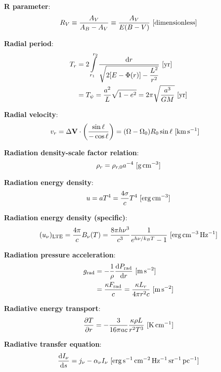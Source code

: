 \documentclass[a4paper,10pt]{article}
\begin{document}
{\noindent}\textbf{R parameter}:
\begin{align*}
    R_V \equiv \frac{A_V}{A_B-A_V} \equiv \frac{A_V}{E(B-V)} ~ [{\rm dimensionless}]
\end{align*}

{\noindent}\textbf{Radial period}:
\begin{align*}
    T_r &= 2\int\limits_{r_1}^{r_2} \frac{{\rm d}r}{\sqrt{2[E-\Phi(r)]-\dfrac{L^2}{r^2}}} ~ [{\rm yr}] \\
    &= T_\psi = \frac{a^2}{L}\sqrt{1-e^2} = 2\pi\sqrt{\frac{a^3}{GM}} ~ [{\rm yr}]
\end{align*}

{\noindent}\textbf{Radial velocity}:
\begin{align*}
    v_r &= \Delta\mathbf{V}\cdot\left(\frac{\sin\ell}{-\cos\ell}\right) = (\Omega-\Omega_0)R_0\sin\ell ~ [{\rm km\,s^{-1}}]
\end{align*}

{\noindent}\textbf{Radiation density-scale factor relation}:
\begin{align*}
    \rho_r = \rho_{r,0}a^{-4} ~ [{\rm g\,cm^{-3}}]
\end{align*}

{\noindent}\textbf{Radiation energy density}:
\begin{align*}
    u = aT^4 = \frac{4\sigma}{c}T^4 ~ [{\rm erg\,cm^{-3}}]
\end{align*}

{\noindent}\textbf{Radiation energy density (specific)}:
\begin{align*}
    (u_\nu)_{\rm LTE} = \frac{4\pi}{c}B_\nu(T) = \frac{8\pi h\nu^3}{c^3}\frac{1}{e^{h\nu/k_BT}-1} ~ [{\rm erg\,cm^{-3}\,Hz^{-1}}]
\end{align*}

{\noindent}\textbf{Radiation pressure acceleration}:
\begin{align*}
    g_{\rm rad} &= -\frac{1}{\rho} \frac{{\rm d}P_{\rm rad}}{{\rm d}r} ~ [{\rm m\,s^{-2}}] \\
    &= \frac{\kappa F_{\rm rad}}{c} = \frac{\kappa L_r}{4\pi r^2c} ~ [{\rm m\,s^{-2}}]
\end{align*}

{\noindent}\textbf{Radiative energy transport}:
\begin{align*}
    \frac{\partial T}{\partial r} = - \frac{3}{16\pi ac} \frac{\kappa\rho L}{r^2T^3} ~ [{\rm K\,cm^{-1}}]
\end{align*}

{\noindent}\textbf{Radiative transfer equation}:
\begin{align*}
    \frac{\mathrm{d}I_\nu}{\mathrm{d}s} = j_\nu - \alpha_\nu I_\nu ~ [{\rm erg\,s^{-1}\,cm^{-2}\,Hz^{-1}\,sr^{-1}\,pc^{-1}}]
\end{align*}
\end{document}
